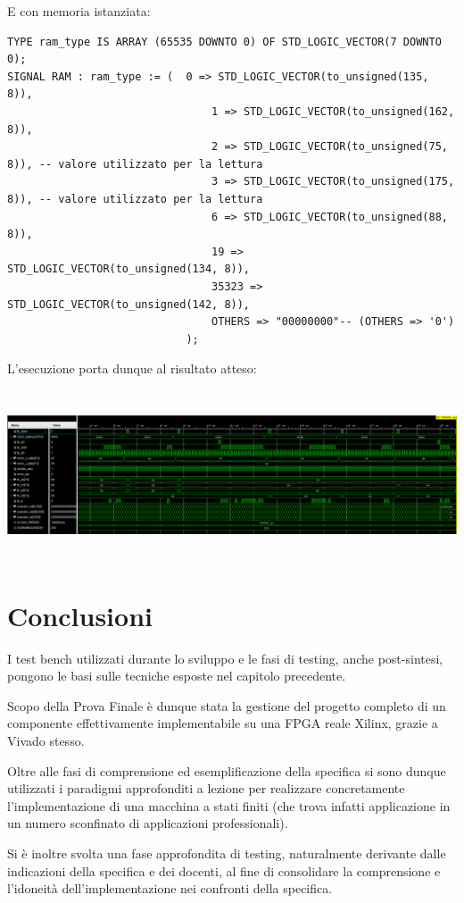 \documentclass[a4paper,11pt]{article} %
\begin{document}
    E con memoria istanziata:

    \begin{verbatim}
TYPE ram_type IS ARRAY (65535 DOWNTO 0) OF STD_LOGIC_VECTOR(7 DOWNTO 0);
SIGNAL RAM : ram_type := (  0 => STD_LOGIC_VECTOR(to_unsigned(135, 8)),
                                1 => STD_LOGIC_VECTOR(to_unsigned(162, 8)),
                                2 => STD_LOGIC_VECTOR(to_unsigned(75, 8)), -- valore utilizzato per la lettura
                                3 => STD_LOGIC_VECTOR(to_unsigned(175, 8)), -- valore utilizzato per la lettura
                                6 => STD_LOGIC_VECTOR(to_unsigned(88, 8)),
                                19 => STD_LOGIC_VECTOR(to_unsigned(134, 8)),
                                35323 => STD_LOGIC_VECTOR(to_unsigned(142, 8)),
                                OTHERS => "00000000"-- (OTHERS => '0')
                            );
    \end{verbatim}

    L'esecuzione porta dunque al risultato atteso:
    \smallskip

    \includegraphics[height=5cm]{../res/tb-4}

    \newpage


    \section{Conclusioni}\label{sec:conclusioni}
    I test bench utilizzati durante lo sviluppo e le fasi di testing, anche post-sintesi, pongono le basi sulle tecniche esposte nel capitolo precedente.

    \bigskip

    Scopo della Prova Finale è dunque stata la gestione del progetto completo di un componente effettivamente implementabile su una FPGA reale Xilinx,
    grazie a Vivado stesso.

    Oltre alle fasi di comprensione ed esemplificazione della specifica si sono dunque utilizzati i paradigmi approfonditi a lezione per realizzare concretamente
    l'implementazione di una macchina a stati finiti (che trova infatti applicazione in un numero sconfinato di applicazioni professionali).

    Si è inoltre svolta una fase approfondita di testing, naturalmente derivante dalle indicazioni della specifica e dei docenti, al fine di consolidare la comprensione e
    l'idoneità dell'implementazione nei confronti della specifica.
\end{document}
